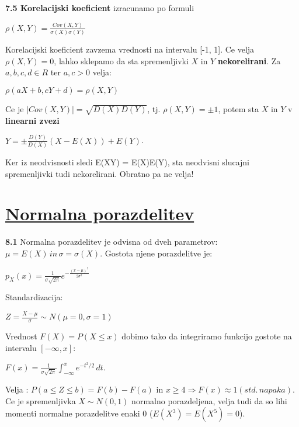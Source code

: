 \documentclass{article}
\begin{document}
\begin{multicols}{3}
\textbf{7.5 Korelacijski koeficient} izracunamo po formuli
\begin{center}
    \begin{math}
        \rho(X,Y) = \frac{Cov(X,Y)}
                      {\sigma(X) \sigma(Y)}
    \end{math}
\end{center}
Korelacijski koeficient zavzema vrednosti na intervalu [-1, 1].
Ce velja $\rho(X, Y) = 0$, lahko sklepamo da sta spremenljivki $X$ in $Y$ \textbf{nekorelirani}.
Za $a, b, c, d \in R$ ter $a, c > 0$ velja:
\begin{center}
    $\rho(aX + b, cY + d) = \rho(X, Y)$
\end{center}
Ce je $|Cov(X, Y)| = \sqrt{D(X)D(Y)}$, tj. $\rho(X, Y) = \pm 1$, potem sta $X$ in $Y$ v \textbf{linearni zvezi}
\begin{center}
    \begin{math}
        Y = \pm \frac{D(Y)}{D(X)}(X - E(X)) + E(Y)
    \end{math}.
\end{center}
Ker iz neodvisnosti sledi E(XY) = E(X)E(Y), sta neodvisni slucajni spremenljivki tudi nekorelirani. Obratno
pa ne velja!

\section{\underline{Normalna porazdelitev}}

\textbf{8.1} Normalna porazdelitev je odvisna od dveh parametrov:
$\mu = E(X)\, in\, \sigma = \sigma(X)$. Gostota njene porazdelitve je:
\begin{center}
    \begin{math}
        p_{X}(x) = \frac{1}{\sigma \sqrt{2 \pi}} e^{- \frac{(x - \mu)^{2}}{2 \sigma^{2}}}
    \end{math}        
\end{center}
Standardizacija: 
\begin{center}
    \begin{math}
        Z = \frac{X - \mu}{\sigma} \sim N(\mu =  0, \sigma = 1)
    \end{math}
\end{center}
Vrednost $F(X) = P(X \leq x)$ dobimo tako da integriramo
funkcijo gostote na intervalu $[-\infty, x]$:
\begin{center}
    \begin{math}
        F(x) = \frac{1}{\sigma \sqrt{2 \pi}} \int_{-\infty}^x e^{-t^2 / 2}\, dt
    \end{math}.
\end{center}
Velja : $P (a \leq Z \leq b) = F(b) - F(a)$ in $x \geq 4 \Rightarrow F(x) \approx 1 (std.\, napaka)$.\\
Ce je spremenljivka $X \sim N(0,1)$ normalno porazdeljena, velja tudi da so lihi momenti normalne porazdelitve enaki 0 ($E(X^3) = E(X^5) = 0$).


\end{multicols}
\end{document}

